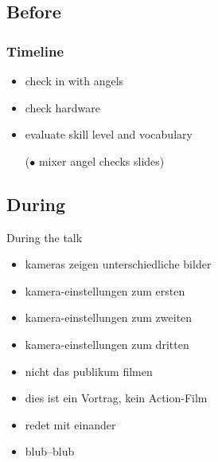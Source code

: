 \documentclass[hyperref={pdfpagelabels=false}]{beamer}
\begin{document}
\subsection{Before}
\begin{frame}
\frametitle{Timeline}
\begin{itemize} %
\item check in with angels %
\item check hardware %
\item evaluate skill level and vocabulary %
\item [($\bullet$] mixer angel checks slides) %
\end{itemize} 
\end{frame}


\subsection{During} %
\begin{frame}{During the talk}
\begin{itemize}
\item  kameras zeigen unterschiedliche bilder 
\item  kamera-einstellungen zum ersten
\item  kamera-einstellungen zum zweiten
\item  kamera-einstellungen zum dritten
\item  nicht das publikum filmen
\item  dies ist ein Vortrag, kein Action-Film 
\item  redet mit einander
\item  blub--blub
\end{itemize} 
\end{frame}
\end{document}
